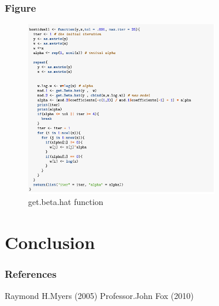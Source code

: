 \documentclass[10pt,aspectratio=32]{beamer}
\begin{document}
\begin{frame}
 \frametitle{Figure}
 \vspace{-0.3cm}
	\begin{figure}[get.beta.hat]
		\centering
		\includegraphics[width=0.75\textwidth]{box.png}
		\caption{get.beta.hat function}
	\end{figure}
\end{frame}

\section{Conclusion}

\begin{frame}
	\frametitle{References}
	\footnotesize{
		\begin{thebibliography}{99} %
			 Raymond H.Myers (2005)
			 Professor.John Fox (2010)
		\end{thebibliography}
	}
\end{frame}




\begin{frame}
 	\titlepage
\end{frame}
\end{document}
